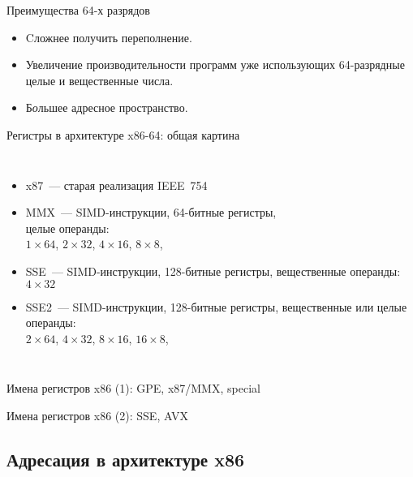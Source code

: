 \begin{frame}{Преимущества 64-х разрядов}
\pause
    \begin{itemize}\itemsep=.5cm
        \item Cложнее получить переполнение.

        \item Увеличение производительности программ уже использующих 64-разрядные целые и вещественные числа.

        \item Б\emph{о}льшее адресное пространство.
    \end{itemize}
\end{frame}

\begin{frame}{Регистры в архитектуре x86-64: общая картина}
\begin{columns}
    \column{7cm}\vspace{-.7cm}
    \column{5cm}
\pause\small\begin{itemize}[<+->]
    \item x87~— старая реализация IEEE~754
    \item MMX~— SIMD-инструкции, 64-битные регистры,\\целые операнды:\\
        $1\times64$, $2\times32$, $4\times16$, $8\times8$,
    \item SSE~— SIMD-инструкции, 128-битные регистры, вещественные операнды:\\
        $4\times32$
    \item SSE2~— SIMD-инструкции, 128-битные регистры,
        вещественные или целые операнды:\\
        $2\times64$, $4\times32$, $8\times16$, $16\times8$,
\end{itemize}
\end{columns}
\end{frame}

\begin{frame}{Имена регистров x86 (1): GPE, x87/MMX, special}
\end{frame}

\begin{frame}{Имена регистров x86 (2): SSE, AVX}
\end{frame}

\subsection{Адресация в архитектуре x86}

